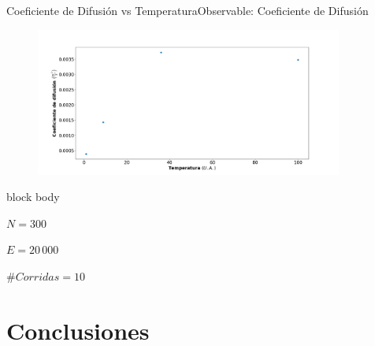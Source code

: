 \documentclass{beamer}
\begin{document}
            \begin{frame}{Coeficiente de Difusión vs Temperatura}{Observable: Coeficiente de Difusión}
                \begin{figure}[H!]
                    \includegraphics[width=0.9\textwidth]{./coefficient_diffusion_vs_temperature}
                    \label{fig:dcm_3}
                \end{figure}
                \begin{beamercolorbox}[sep=5pt,center]{block body}
                    \begin{minipage}[t]{0.3\textwidth}
                        \centering
                        \small{$N=300$}
                    \end{minipage}
                    \hfill
                    \begin{minipage}[t]{0.3\textwidth}
                        \centering
                        \small{$E=20\,000$}
                    \end{minipage}
                    \hfill
                    \begin{minipage}[t]{0.3\textwidth}
                        \centering
                        \small{$\#Corridas = 10$}
                    \end{minipage}
                \end{beamercolorbox}
            \end{frame}

    \section{Conclusiones}
\end{document}
